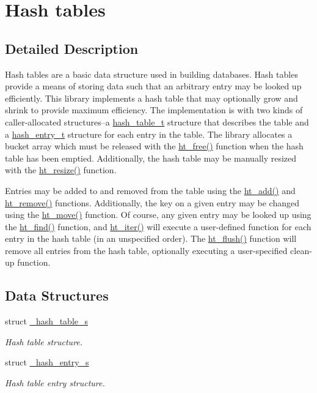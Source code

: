 \hypertarget{group__dbprim__hash}{
\section{Hash tables}
\label{group__dbprim__hash}
}


\subsection{Detailed Description}
Hash tables are a basic data structure used in building databases. Hash tables provide a means of storing data such that an arbitrary entry may be looked up efficiently. This library implements a hash table that may optionally grow and shrink to provide maximum efficiency. The implementation is with two kinds of caller-allocated structures--a \hyperlink{group__dbprim__hash_ga1}{hash\_\-table\_\-t} structure that describes the table and a \hyperlink{group__dbprim__hash_ga2}{hash\_\-entry\_\-t} structure for each entry in the table. The library allocates a bucket array which must be released with the \hyperlink{group__dbprim__hash_ga17}{ht\_\-free()} function when the hash table has been emptied. Additionally, the hash table may be manually resized with the \hyperlink{group__dbprim__hash_ga16}{ht\_\-resize()} function.

Entries may be added to and removed from the table using the \hyperlink{group__dbprim__hash_ga10}{ht\_\-add()} and \hyperlink{group__dbprim__hash_ga12}{ht\_\-remove()} functions. Additionally, the key on a given entry may be changed using the \hyperlink{group__dbprim__hash_ga11}{ht\_\-move()} function. Of course, any given entry may be looked up using the \hyperlink{group__dbprim__hash_ga13}{ht\_\-find()} function, and \hyperlink{group__dbprim__hash_ga14}{ht\_\-iter()} will execute a user-defined function for each entry in the hash table (in an unspecified order). The \hyperlink{group__dbprim__hash_ga15}{ht\_\-flush()} function will remove all entries from the hash table, optionally executing a user-specified clean-up function.

\subsection*{Data Structures}
\begin{CompactItemize}
\item 
struct \hyperlink{struct__hash__table__s}{\_\-hash\_\-table\_\-s}
\begin{CompactList}\small\item\em Hash table structure. \item\end{CompactList}\item 
struct \hyperlink{struct__hash__entry__s}{\_\-hash\_\-entry\_\-s}
\begin{CompactList}\small\item\em Hash table entry structure. \item\end{CompactList}\end{CompactItemize}
